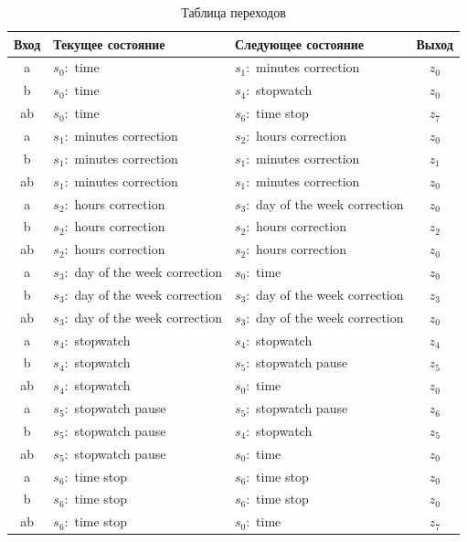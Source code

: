 \documentclass[a4paper, final]{article}
\begin{document}
\newpage
\begin{table}[H]
  \centering
  \caption{Таблица переходов}
  \label{tbl:perehod}
  \footnotesize
  \begin{tabularx}{0.85\textwidth}{|c|X||X|c|}
  \hline
  \textbf{Вход} & \textbf{Текущее состояние} & \textbf{Следующее состояние} & \textbf{Выход} \\
  \hline
  \hline
  a  & $s_0:$ time & $s_1:$ minutes correction & $z_0$ \\
  b  & $s_0:$ time & $s_4:$ stopwatch & $z_0$ \\
  ab & $s_0:$ time & $s_6:$ time stop & $z_7$ \\
  \hline

  a  & $s_1:$ minutes correction & $s_2:$ hours correction & $z_0$ \\
  b  & $s_1:$ minutes correction & $s_1:$ minutes correction & $z_1$ \\
  ab & $s_1:$ minutes correction & $s_1:$ minutes correction & $z_0$ \\
  \hline

  a  & $s_2:$ hours correction & $s_3:$ day of the week correction& $z_0$ \\
  b  & $s_2:$ hours correction & $s_2:$ hours correction & $z_2$ \\
  ab & $s_2:$ hours correction & $s_2:$ hours correction & $z_0$ \\
  \hline

  a  & $s_3:$ day of the week correction & $s_0:$ time & $z_0$ \\
  b  & $s_3:$ day of the week correction & $s_3:$ day of the week correction & $z_3$ \\
  ab & $s_3:$ day of the week correction & $s_3:$ day of the week correction & $z_0$ \\
  \hline

  a  & $s_4:$ stopwatch & $s_4:$ stopwatch & $z_4$ \\
  b  & $s_4:$ stopwatch & $s_5:$ stopwatch pause & $z_5$ \\
  ab & $s_4:$ stopwatch & $s_0:$ time & $z_0$ \\
  \hline

  a  & $s_5:$ stopwatch pause & $s_5:$ stopwatch pause & $z_6$ \\
  b  & $s_5:$ stopwatch pause & $s_4:$ stopwatch & $z_5$ \\
  ab & $s_5:$ stopwatch pause & $s_0:$ time & $z_0$ \\
  \hline

  a  & $s_6:$ time stop & $s_6:$ time stop & $z_0$ \\
  b  & $s_6:$ time stop & $s_6:$ time stop & $z_0$ \\
  ab & $s_6:$ time stop & $s_0:$ time & $z_7$ \\
  \hline
  \end{tabularx}
\end{table}
\end{document}

